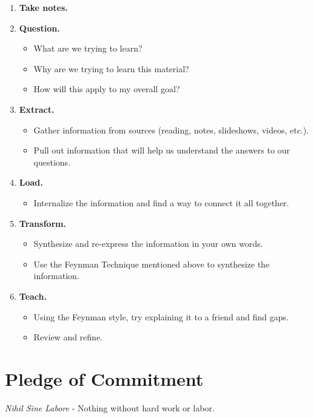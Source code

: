 \begin{enumerate}
    \item \textbf{Take notes.}

    \item \textbf{Question.}
    \begin{itemize}
        \item What are we trying to learn?
        \item Why are we trying to learn this material?
        \item How will this apply to my overall goal?
    \end{itemize}

    \item \textbf{Extract.}
    \begin{itemize}
        \item Gather information from sources (reading, notes, slideshows, videos, etc.).
        \item Pull out information that will help us understand the answers to our questions.
    \end{itemize}

    \item \textbf{Load.}
    \begin{itemize}
        \item Internalize the information and find a way to connect it all together.
    \end{itemize}

    \item \textbf{Transform.}
    \begin{itemize}
        \item Synthesize and re-express the information in your own words.
        \item Use the Feynman Technique mentioned above to synthesize the information.
    \end{itemize}

    \item \textbf{Teach.}
    \begin{itemize}
        \item Using the Feynman style, try explaining it to a friend and find gaps.
        \item Review and refine.
    \end{itemize}
\end{enumerate}

\section{Pledge of Commitment}

\textit{Nihil Sine Labore} - Nothing without hard work or labor.